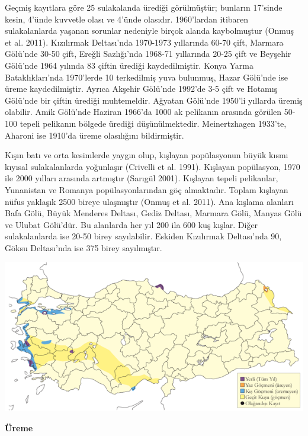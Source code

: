 \documentclass[
  letterpaper,
  DIV=11,
  numbers=noendperiod]{scrreprt}
\begin{document}
Geçmiş kayıtlara göre 25 sulakalanda ürediği görülmüştür; bunların
17'sinde kesin, 4'ünde kuvvetle olası ve 4'ünde olasıdır. 1960'lardan
itibaren sulakalanlarda yaşanan sorunlar nedeniyle birçok alanda
kaybolmuştur (Onmuş et al. 2011). Kızılırmak Deltası'nda 1970-1973
yıllarında 60-70 çift, Marmara Gölü'nde 30-50 çift, Ereğli Sazlığı'nda
1968-71 yıllarında 20-25 çift ve Beyşehir Gölü'nde 1964 yılında 83
çiftin ürediği kaydedilmiştir. Konya Yarma Bataklıkları'nda 1970'lerde
10 terkedilmiş yuva bulunmuş, Hazar Gölü'nde ise üreme kaydedilmiştir.
Ayrıca Akşehir Gölü'nde 1992'de 3-5 çift ve Hotamış Gölü'nde bir çiftin
ürediği muhtemeldir. Ağyatan Gölü'nde 1950'li yıllarda üremiş olabilir.
Amik Gölü'nde Haziran 1966'da 1000 ak pelikanın arasında görülen 50-100
tepeli pelikanın bölgede ürediği düşünülmektedir. Meinertzhagen 1933'te,
Aharoni ise 1910'da üreme olasılığını bildirmiştir.

Kışın batı ve orta kesimlerde yaygın olup, kışlayan popülasyonun büyük
kısmı kıyısal sulakalanlarda yoğunlaşır (Crivelli et al. 1991). Kışlayan
popülasyon, 1970 ile 2000 yılları arasında artmıştır (Sarıgül 2001).
Kışlayan tepeli pelikanlar, Yunanistan ve Romanya popülasyonlarından göç
almaktadır. Toplam kışlayan nüfus yaklaşık 2500 bireye ulaşmıştır (Onmuş
et al. 2011). Ana kışlama alanları Bafa Gölü, Büyük Menderes Deltası,
Gediz Deltası, Marmara Gölü, Manyas Gölü ve Ulubat Gölü'dür. Bu
alanlarda her yıl 200 ila 600 kuş kışlar. Diğer sulakalanlarda ise 20-50
birey sayılabilir. Eskiden Kızılırmak Deltası'nda 90, Göksu Deltası'nda
ise 375 birey sayılmıştır.

\includegraphics{images/harita_Page_075.png}

\textbf{Üreme}
\end{document}
